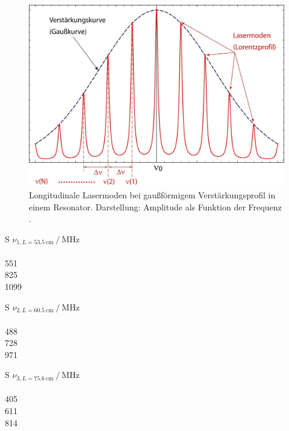 \begin{figure}
  \centering
  \includegraphics[height=8cm]{Pics von Buddy/LaserModes.jpg}
  \caption{Longitudinale Lasermoden bei gaußförmigem Verstärkungsprofil in einem Resonator. Darstellung: Amplitude als Funktion der Frequenz \cite{longimodenBild}.}
  \label{fig:LaserModes}
\end{figure}

\begin{table}
  \centering
  \begin{tabular}{S}
    \toprule
    {$\nu_{1, L = \SI{53.5}{\centi\meter}}\:/\:\si{\mega\hertz}$}\\
    \\
551\\
825\\
1099\\
    \bottomrule
  \end{tabular}
  \begin{tabular}{S}
    \toprule
    {$\nu_{2, L = \SI{60.5}{\centi\meter}}\:/\:\si{\mega\hertz}$}\\
    \\
488\\
728\\
971\\
    \bottomrule
  \end{tabular}
  \begin{tabular}{S}
    \toprule
    {$\nu_{3, L = \SI{75.6}{\centi\meter}}\:/\:\si{\mega\hertz}$}\\
    \\
405\\
611\\
814\\
    \bottomrule
  \end{tabular}
  \caption{Messwerte der Frequenzmessung bei unterschiedlichen Resonatorlängen. Als Fehler der Frequenzmessung wird $\sigma_{\nu} = \SI{5}{\mega\hertz}$ angenommen.}
  \label{tab:longiModen}
\end{table}

